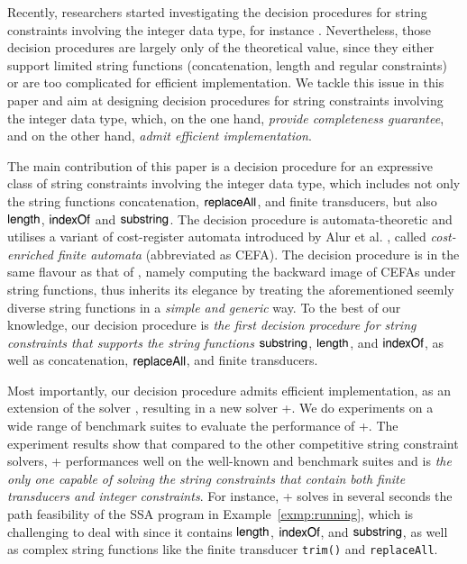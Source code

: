 Recently, researchers started investigating the decision procedures for string constraints involving the integer data type, for instance \cite{Vijay-length,L16,LinM18,LB16}. Nevertheless, those decision procedures are largely only of the theoretical value, since they either support limited string functions (concatenation, length and regular constraints) or are too complicated for efficient implementation. We tackle this issue in this paper and aim at designing decision procedures for string constraints involving the integer data type, which, on the one hand, \emph{provide completeness guarantee}, and on the other hand, \emph{admit efficient implementation}.

The main contribution of this paper is a decision procedure for an expressive class of string constraints involving the integer data type, which includes not only the string functions concatenation, $\mathsf{replaceAll}$, and finite transducers, but also $\mathsf{length}$, $\mathsf{indexOf}$ and $\mathsf{substring}$. The decision procedure is automata-theoretic and utilises a variant of cost-register automata introduced by Alur et al. \cite{RLJ+13}, called \emph{cost-enriched finite automata} (abbreviated as CEFA). The decision procedure is in the same flavour as that of {\ostrich} \cite{CHL+19}, namely computing the backward image of CEFAs under string functions, thus inherits its elegance by treating the aforementioned seemly diverse string functions in a \emph{simple and generic} way. To the best of our knowledge, our decision procedure is \emph{the first decision procedure for string constraints that supports the string functions} $\mathsf{substring}$, $\mathsf{length}$, and $\mathsf{indexOf}$, as well as concatenation, $\mathsf{replaceAll}$, and finite transducers. 

Most importantly, our decision procedure admits efficient implementation, as an extension of the {\ostrich} solver \cite{CHL+19}, resulting in a new solver {\ostrich}+.  We do experiments on a wide range of benchmark suites to evaluate the performance of {\ostrich}+. The experiment results show that compared to the other competitive string constraint solvers, {\ostrich}+ performances well on the well-known {\kaluzabench} and {\pyexbench} benchmark suites and is \emph{the only one capable of solving the string constraints that contain both finite transducers and integer constraints}. For instance, {\ostrich}+ solves in several seconds  the path feasibility of the SSA program in Example~\ref{exmp:running}, which is challenging to deal with since it contains $\mathsf{length}$, $\mathsf{indexOf}$, and $\mathsf{substring}$, as well as complex string functions like the finite transducer {\tt trim()} and {\tt replaceAll}. 



